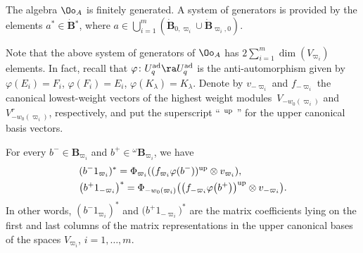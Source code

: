 \begin{prop}\label{genOA} The algebra $\Oo_A$ is finitely generated. A system of generators is provided by the elements $a^*\in \dot {\mathbf{B}} {}^*$, where $a \in \bigcup_{i=1}^m (\dot{\mathbf{B}}_{0,\varpi_i}\cup \dot{\mathbf{B}}_{\varpi_i,0})$.\end{prop}
Note that the above system of generators of $\Oo_A$ has
$2 \sum_{i=1}^m \dim(V_{\varpi_i})$
 elements. In fact, recall that $\varphi\colon U_q^{\rm ad} \ra U_q^{\rm ad}$ is the anti-automorphism given by $\varphi(E_i) = F_i$, $\varphi(F_i) = E_i$, $\varphi(K_\lambda) = K_{\lambda}$. Denote by $v_{-\varpi_i}$ and $f_{-\varpi_i}$ the canonical lowest-weight vectors of the highest weight modules~${V_{-w_0(\varpi_i)}}$ and $V_{-w_0(\varpi_i)}^r$, respectively, and put the superscript `` ${}^{\rm up}$ '' for the upper canonical basis vectors.
\begin{lem} For every $b^- \in \mathbf{B}_{\varpi_i}$ and $b^+\in {}^\omega \mathbf{B}_{\varpi_i}$, we have
\begin{align}
 &(b^-1_{\varpi_i})^* = \Phi_{\varpi_i}((f_{\varpi_i} \varphi(b^-))^{\rm up} \otimes v_{\varpi_i}), \label{formgenOA1} \\
 &\big(b^+1_{-\varpi_i}\big)^* = \Phi_{-w_0(\varpi_i)}\big(\big(f_{-\varpi_i} \varphi\big(b^+\big)\big)^{\rm up} \otimes v_{-\varpi_i}\big). \label{formgenOA2} \end{align}
In other words, $(b^-1_{\varpi_i})^*$ and $\big(b^+1_{-\varpi_i}\big)^*$ are the matrix coefficients lying on the first and last columns of the matrix representations in the upper canonical bases of the spaces $V_{\varpi_i}$, ${i=1,\dots, m}$.
\end{lem}

